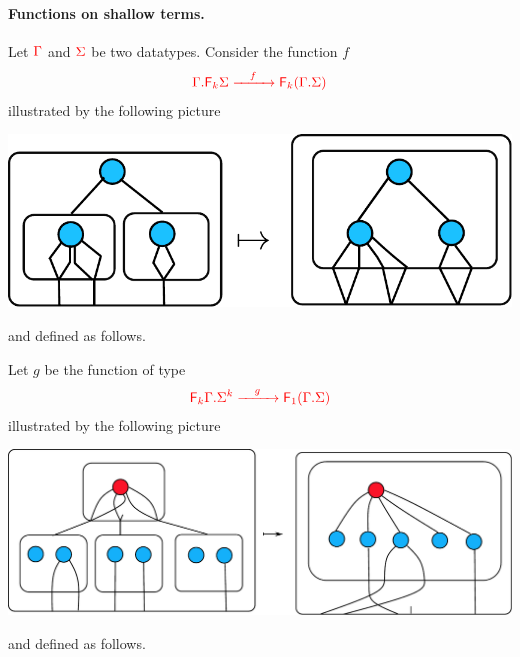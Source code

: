 \paragraph*{Functions on shallow terms.} Let ${\color{red}{\Gamma}}$ and ${\color{red}{\Sigma}}$ be two datatypes.  Consider the function $f$
\begin{align*}
{\color{red}{{\color{red}{\Gamma . {\color{red}{\mathsf F_{k}}}\Sigma}} \xrightarrow{\quad f\quad} {\color{red}{\mathsf F_{k}}}({\color{red}{\Gamma . \Sigma}})}} 
\end{align*}
illustrated by the following picture  
\begin{center}
\includegraphics[scale=.4]{pictures/shallow-fold-distrib}
\end{center}
and defined as follows. 

Let $g$ be the function of type
\begin{align*}
{\color{red}{{\color{red}{{\color{red}{\mathsf F_{k}}}\Gamma . \Sigma^k}} \xrightarrow{\quad g\quad} {\color{red}{\mathsf F_{1}}}({\color{red}{\Gamma . \Sigma}})}} 
\end{align*}
illustrated by the following picture  
\begin{center}
\includegraphics[scale=.37]{pictures/shallow-unfold}
\end{center}
and defined as follows. 

